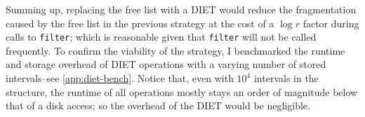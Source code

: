 Summing up, replacing the free list with a DIET would reduce the fragmentation caused by the free list in the previous strategy at the cost of a \(\log{r}\) factor during calls to \texttt{filter}; which is reasonable given that \texttt{filter} will not be called frequently. To confirm the viability of the strategy, I benchmarked the runtime and storage overhead of DIET operations with a varying number of stored intervals--see \cref{app:diet-bench}. Notice that, even with \(10^4\) intervals in the structure, the runtime of all operations mostly stays an order of magnitude below that of a disk access; so the overhead of the DIET would be negligible.